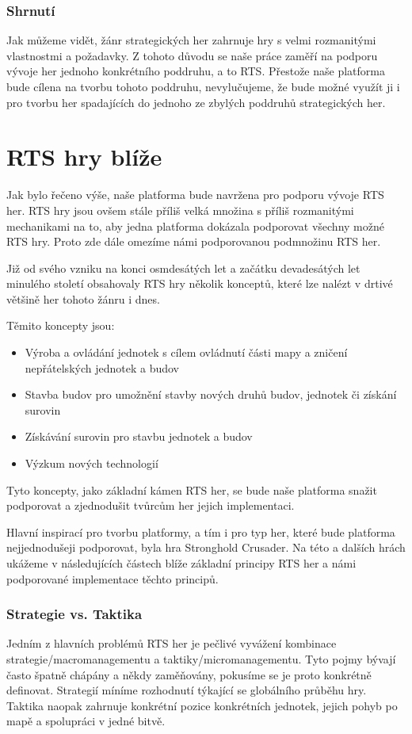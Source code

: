 \subsubsection{Shrnutí}

Jak můžeme vidět, žánr strategických her zahrnuje hry s velmi rozmanitými vlastnostmi a požadavky. Z tohoto důvodu se naše práce zaměří na podporu vývoje her jednoho konkrétního poddruhu, a to RTS. Přestože naše platforma bude cílena na tvorbu tohoto poddruhu, nevylučujeme, že bude možné využít ji i pro tvorbu her spadajících do jednoho ze zbylých poddruhů strategických her.


\section{RTS hry blíže}
Jak bylo řečeno výše, naše platforma bude navržena pro podporu vývoje RTS her. RTS hry jsou ovšem stále příliš velká množina s příliš rozmanitými mechanikami na to, aby jedna platforma dokázala podporovat všechny možné RTS hry. Proto zde dále omezíme námi podporovanou podmnožinu RTS her.

Již od svého vzniku na konci osmdesátých let a začátku devadesátých let minulého století obsahovaly RTS hry několik konceptů, které lze nalézt v drtivé většině her tohoto žánru i dnes. 

Těmito koncepty jsou:
\begin{itemize}
	\item Výroba a ovládání jednotek s cílem ovládnutí části mapy a zničení nepřátelských jednotek a budov
	\item Stavba budov pro umožnění stavby nových druhů budov, jednotek či získání surovin
	\item Získávání surovin pro stavbu jednotek a budov
	\item Výzkum nových technologií
\end{itemize}

Tyto koncepty, jako základní kámen RTS her, se bude naše platforma snažit podporovat a zjednodušit tvůrcům her jejich implementaci.

Hlavní inspirací pro tvorbu platformy, a tím i pro typ her, které bude platforma nejjednodušeji podporovat, byla hra Stronghold Crusader. Na této a dalších hrách ukážeme v následujících částech blíže základní principy RTS her a námi podporované implementace těchto principů.

\done
{}
\subsubsection*{Strategie vs. Taktika}
Jedním z hlavních problémů RTS her je pečlivé vyvážení kombinace strategie/macromanagementu a taktiky/micromanagementu. Tyto pojmy bývají často špatně chápány a někdy zaměňovány, pokusíme se je proto konkrétně definovat. Strategií míníme  rozhodnutí týkající se globálního průběhu hry. Taktika  naopak zahrnuje konkrétní pozice konkrétních jednotek, jejich pohyb po mapě a spolupráci v jedné bitvě. 

